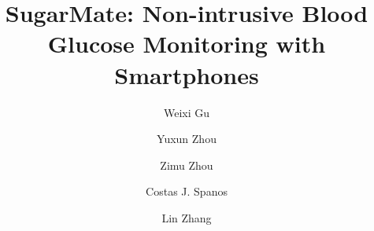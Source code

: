 \documentclass[acmlarge]{acmart}
\begin{document}
\title{SugarMate: Non-intrusive Blood Glucose Monitoring with Smartphones}

\author{Weixi Gu}
\author{Yuxun Zhou}
\author{Zimu Zhou}
%

\author{Costas J. Spanos}

\author{Lin Zhang}
\end{document}
